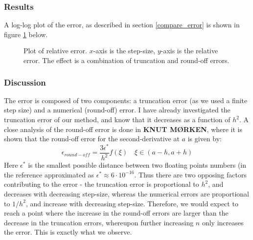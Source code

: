 \documentclass[a4paper, 10pt]{article}
\begin{document}
\subsubsection{Results}
A log-log plot of the error, as described in section \ref{compare_error} is shown in figure \ref{fig:figure_3} below.
\begin{center}
\begin{figure}[h]
\caption{Plot of relative error. $x$-axis is the step-size, $y$-axis is the relative error. The effect is a combination of truncation and round-off errors.} 
\label{fig:figure_3}
\end{figure}
\end{center}
\subsubsection{Discussion}
The error is composed of two components: a truncation error (as we used a finite step size) and a numerical (round-off) error. I have already investigated the truncation error of our method, and know that it decreases as a function of $h^2$. A close analysis of the round-off error is done in \textbf{KNUT MØRKEN}, where it is shown that the round-off error for the second-derivative at $a$ is given by:
\begin{equation}
\epsilon_{round-off} = \frac{3\epsilon^*}{h^2}f(\xi) \quad \xi \in (a-h, a+h)
\end{equation}
Here $\epsilon^*$ is the smallest possible distance between two floating points numbers (in the reference approximated as $\epsilon^* \approx 6\cdot 10^{-16}$. Thus there are two opposing factors contributing to the error - the truncation error is proportional to $h^2$, and decreases with decreasing step-size, whereas the numerical errors are proportional to $1/h^2$, and increase with decreasing step-size. Therefore, we would expect to reach a point where the increase in the round-off errors are larger than the decrease in the truncation errors, whereupon further increasing $n$ only increases the error. This is exactly what we observe.
\end{document}
